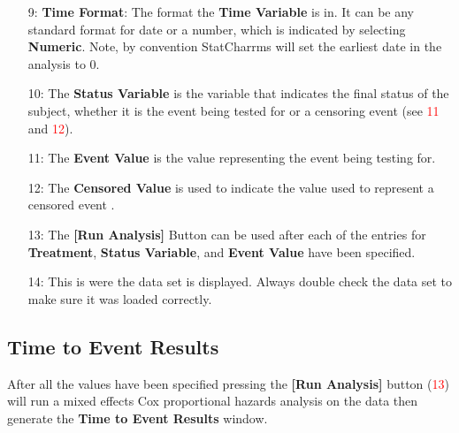 \documentclass[a4paper]{article}
\begin{document}
\begin{enumerate}
\item[\begingroup\color{red}9:\endgroup] \textbf{Time Format}: The format the \textbf{Time Variable} is in. It can be any standard 
	format for date or a number, which is indicated by selecting \textbf{Numeric}. Note, by convention StatCharrms will set the 
	earliest date in the analysis to 0. 

\item[\begingroup\color{red}10:\endgroup] The \textbf{Status Variable} is the variable that indicates the final status of the subject, 
	whether it is the event being tested for or a censoring event (see \textcolor{red}{11} and \textcolor{red}{12}).    

\item[\begingroup\color{red}11:\endgroup]  The \textbf{Event Value} is the value representing the event being testing for. 

\item[\begingroup\color{red}12:\endgroup] The \textbf{Censored Value} is used to indicate the value used to represent a censored event . 

\item[\begingroup\color{red}13:\endgroup] The \textbf{[Run Analysis]} Button can be used after each of the entries for \textbf{Treatment}, \textbf{Status Variable}, and 
	\textbf{Event Value} have been specified. 

\item[\begingroup\color{red}14:\endgroup] This is were the data set is displayed.  
	Always double check the data set to make sure it was loaded correctly.  

\end{enumerate}

\label{subsec:Time2EventResults}
\subsection*{Time to Event Results}

After all the values have been specified pressing the \textbf{[Run Analysis]} button (\textcolor{red}{13}) will run a 
mixed effects Cox proportional hazards analysis on the data then generate the \textbf{Time to Event Results} window. 
\end{document}
